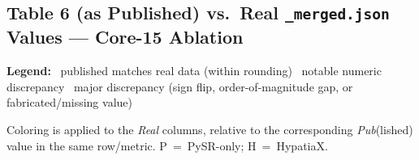 \documentclass[11pt]{article}
\newcommand{\legenditem}[2]{\colorbox{#1}{\phantom{XX}}~#2}
\begin{document}
\begin{landscape}

\subsection*{Table 6 (as Published) vs.\ Real \texttt{\_merged.json} Values --- Core-15 Ablation}

\textbf{Legend:} \quad
\legenditem{match}{published matches real data (within rounding)} \qquad
\legenditem{minor}{notable numeric discrepancy} \qquad
\legenditem{major}{major discrepancy (sign flip, order-of-magnitude gap, or fabricated/missing value)}

\bigskip
\noindent Coloring is applied to the \emph{Real} columns, relative to the
corresponding \emph{Pub}(lished) value in the same row/metric. P~=~PySR-only;
H~=~HypatiaX.

\bigskip


\end{landscape}
\end{document}
